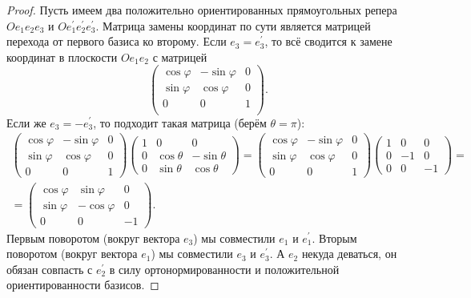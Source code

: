 \begin{proof}
    Пусть имеем два положительно ориентированных прямоугольных репера $Oe_1e_2e_3$ и $Oe_1^\prime e_2^\prime e_3^\prime$. Матрица замены координат по сути является матрицей перехода от первого базиса ко второму. Если $e_3 = e_3^\prime$, то всё сводится к замене координат в плоскости $Oe_1e_2$ с матрицей
    $$
    \begin{pmatrix}
        \cos\varphi & -\sin\varphi & 0\\
        \sin\varphi & \cos\varphi & 0\\
        0 & 0 & 1\\
    \end{pmatrix}.
    $$
    Если же $e_3 = -e_3^\prime$, то подходит такая матрица (берём $\theta = \pi$):
    $$
    \begin{array}{c}
        \begin{pmatrix}
            \cos\varphi & -\sin\varphi & 0\\
            \sin\varphi & \cos\varphi & 0\\
            0 & 0 & 1
        \end{pmatrix}
        \begin{pmatrix}
            1 & 0 & 0\\
            0 & \cos\theta & -\sin\theta\\
            0 & \sin\theta & \cos\theta
        \end{pmatrix} = 
        \begin{pmatrix}
            \cos\varphi & -\sin\varphi & 0\\
            \sin\varphi & \cos\varphi & 0\\
            0 & 0 & 1
        \end{pmatrix}
        \begin{pmatrix}
            1 & 0 & 0\\
            0 & -1 & 0\\
            0 & 0 & -1
        \end{pmatrix} = {}\\{} =
        \begin{pmatrix}
            \cos\varphi & \sin\varphi & 0\\
            \sin\varphi & -\cos\varphi & 0\\
            0 & 0 & -1
        \end{pmatrix}.
    \end{array}
    $$
    Первым поворотом (вокруг вектора $e_3$) мы совместили $e_1$ и $e_1^\prime$. Вторым поворотом (вокруг вектора $e_1$) мы совместили $e_3$ и $e_3^\prime$. А $e_2$ некуда деваться, он обязан совпасть с $e_2^\prime$ в силу ортонормированности и положительной ориентированности базисов.
    

\end{proof}
